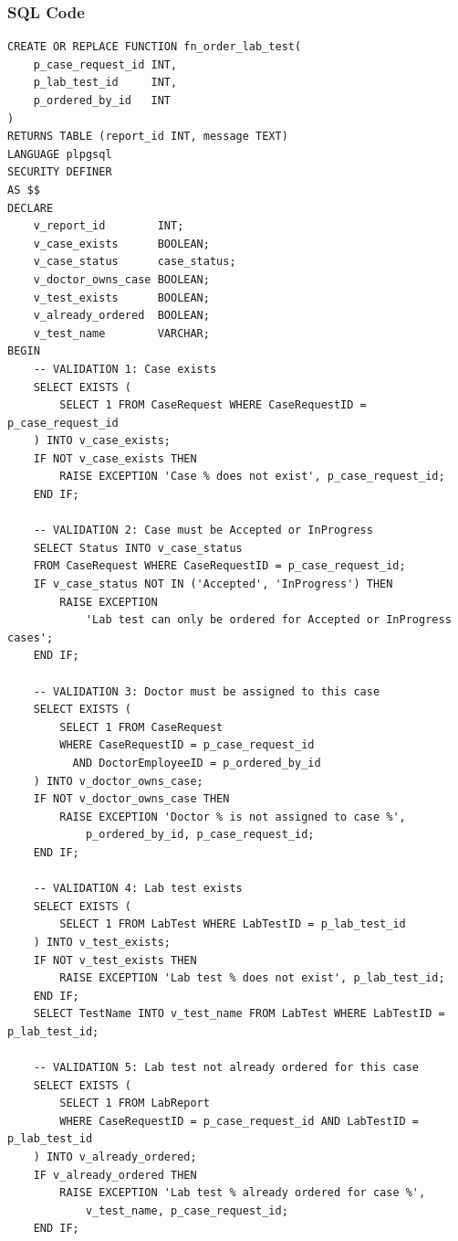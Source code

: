 \documentclass{article}
\begin{document}
\subsubsection{SQL Code}

\begin{lstlisting}
CREATE OR REPLACE FUNCTION fn_order_lab_test(
    p_case_request_id INT,
    p_lab_test_id     INT,
    p_ordered_by_id   INT
)
RETURNS TABLE (report_id INT, message TEXT)
LANGUAGE plpgsql
SECURITY DEFINER
AS $$
DECLARE
    v_report_id        INT;
    v_case_exists      BOOLEAN;
    v_case_status      case_status;
    v_doctor_owns_case BOOLEAN;
    v_test_exists      BOOLEAN;
    v_already_ordered  BOOLEAN;
    v_test_name        VARCHAR;
BEGIN
    -- VALIDATION 1: Case exists
    SELECT EXISTS (
        SELECT 1 FROM CaseRequest WHERE CaseRequestID = p_case_request_id
    ) INTO v_case_exists;
    IF NOT v_case_exists THEN
        RAISE EXCEPTION 'Case % does not exist', p_case_request_id;
    END IF;

    -- VALIDATION 2: Case must be Accepted or InProgress
    SELECT Status INTO v_case_status
    FROM CaseRequest WHERE CaseRequestID = p_case_request_id;
    IF v_case_status NOT IN ('Accepted', 'InProgress') THEN
        RAISE EXCEPTION
            'Lab test can only be ordered for Accepted or InProgress cases';
    END IF;

    -- VALIDATION 3: Doctor must be assigned to this case
    SELECT EXISTS (
        SELECT 1 FROM CaseRequest
        WHERE CaseRequestID = p_case_request_id
          AND DoctorEmployeeID = p_ordered_by_id
    ) INTO v_doctor_owns_case;
    IF NOT v_doctor_owns_case THEN
        RAISE EXCEPTION 'Doctor % is not assigned to case %',
            p_ordered_by_id, p_case_request_id;
    END IF;

    -- VALIDATION 4: Lab test exists
    SELECT EXISTS (
        SELECT 1 FROM LabTest WHERE LabTestID = p_lab_test_id
    ) INTO v_test_exists;
    IF NOT v_test_exists THEN
        RAISE EXCEPTION 'Lab test % does not exist', p_lab_test_id;
    END IF;
    SELECT TestName INTO v_test_name FROM LabTest WHERE LabTestID = p_lab_test_id;

    -- VALIDATION 5: Lab test not already ordered for this case
    SELECT EXISTS (
        SELECT 1 FROM LabReport
        WHERE CaseRequestID = p_case_request_id AND LabTestID = p_lab_test_id
    ) INTO v_already_ordered;
    IF v_already_ordered THEN
        RAISE EXCEPTION 'Lab test % already ordered for case %',
            v_test_name, p_case_request_id;
    END IF;


\end{lstlisting}
\end{document}
